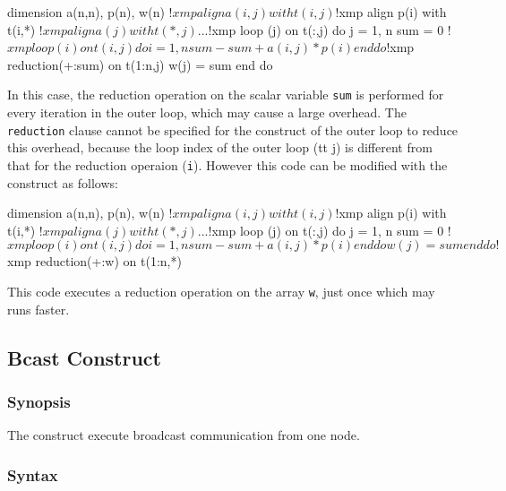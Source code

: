 \begin{description}
\begin{Fexample}
      dimension a(n,n), p(n), w(n)
!$xmp align a(i,j) with t(i,j)
!$xmp align p(i) with t(i,*)
!$xmp align a(j) with t(*,j)
      ...
!$xmp loop (j) on t(:,j)
      do j = 1, n
          sum = 0
!$xmp loop (i) on t(i,j) 
          do i = 1, n
              sum - sum + a(i,j) * p(i)
          end do
!$xmp reduction(+:sum) on t(1:n,j)
          w(j) = sum
      end do
\end{Fexample}

In this case, the reduction operation on the scalar variable {\tt sum}
is performed for every iteration in the outer loop, which may cause a
large overhead.
The {\tt reduction} clause cannot be specified for the {\tt {}} construct of the outer
loop to reduce this overhead, because the loop index of the outer loop ({tt j}) is different from that
for the reduction operaion ({\tt i}).
However this code can be modified with  the {\tt {}} construct 
as follows:

\begin{Fexample}
      dimension a(n,n), p(n), w(n)
!$xmp align a(i,j) with t(i,j)
!$xmp align p(i) with t(i,*)
!$xmp align a(j) with t(*,j)
      ...
!$xmp loop (j) on t(:,j)
      do j = 1, n
          sum = 0
!$xmp loop (i) on t(i,j) 
          do i = 1, n
              sum - sum + a(i,j) * p(i)
          end do
          w(j) = sum
      end do
!$xmp reduction(+:w) on t(1:n,*)
\end{Fexample}

This code executes a reduction operation on the array {\tt w}, just once
which may runs faster. 

\end{description}

\subsection{Bcast Construct}

\subsubsection*{Synopsis}

The {\tt {}} construct execute broadcast communication
from one node.

\subsubsection*{Syntax}

